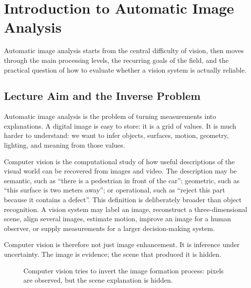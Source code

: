 \section{Introduction to Automatic Image Analysis}

Automatic image analysis starts from the central difficulty of vision, then
moves through the main processing levels, the recurring goals of the field, and
the practical question of how to evaluate whether a vision system is actually
reliable.

\subsection{Lecture Aim and the Inverse Problem}

Automatic image analysis is the problem of turning measurements into
explanations. A digital image is easy to store: it is a grid of values. It is
much harder to understand: we want to infer objects, surfaces, motion, geometry,
lighting, and meaning from those values.

Computer vision is the computational study of how useful descriptions of the
visual world can be recovered from images and video. The description may be
semantic, such as ``there is a pedestrian in front of the car''; geometric, such
as ``this surface is two meters away''; or operational, such as ``reject this
part because it contains a defect''. This definition is deliberately broader
than object recognition. A vision system may label an image, reconstruct a
three-dimensional scene, align several images, estimate motion, improve an image
for a human observer, or supply measurements for a larger decision-making
system.

Computer vision is therefore not just image enhancement. It is inference under
uncertainty. The image is evidence; the scene that produced it is hidden.

\begin{figure}[ht]
  \centering
  \caption{Computer vision tries to invert the image formation process: pixels
  are observed, but the scene explanation is hidden.}
\end{figure}

